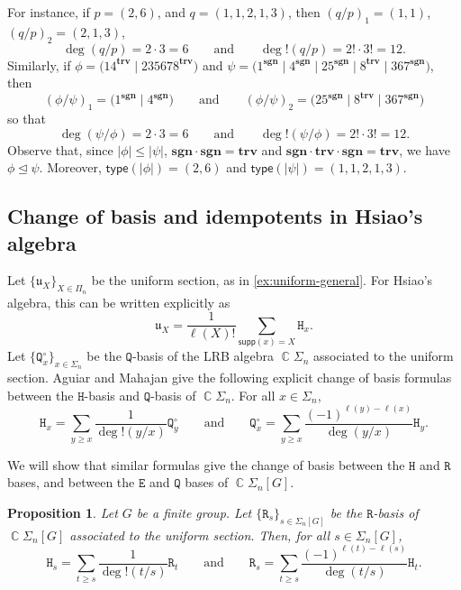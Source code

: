 \documentclass[11pt, oneside, reqno]{amsart}
\newtheorem{prop}[theorem]{Proposition}
\theoremstyle{definition}
\numberwithin{equation}{section}
\DeclareMathOperator{\C}{\mathbb{C}}
\def \kk{\C}
\def \uu{{\mathfrak{u}}}
\def \gsetcomposition{{\Sigma_n[G]}}
\def \hsiao {{\gsetcomposition}}
\DeclareMathOperator{\chleq}{\unlhd}
\def\qqand{\qquad\text{and}\qquad}
\def \supp{\mathsf{supp}}
\def \type{\mathsf{type}}
\def \sgn{\mathbf{sgn}}
\def \trv{\mathbf{trv}}
\newcommand{\B}[1]{\mathtt{#1}} 			%
\newcommand{\abs}[1]{|{#1}|} 				%
\begin{document}
For instance, if $p = (2,6)$, and $q = (1,1,2,1,3)$, then $(q/p)_1 = (1,1)$, $(q/p)_2 = (2,1,3)$,
\[
    \deg(q/p) = 2 \cdot 3 = 6
    \qqand
    \deg!(q/p) = 2! \cdot 3! = 12.
\]
Similarly, if $\phi = \big( 14^{\trv} \mid 235678^{\trv} \big)$ and
$\psi = \big( 1^{\sgn} \mid 4^{\sgn} \mid 25^{\sgn} \mid 8^{\trv} \mid 367^{\sgn} \big)$,
then
\begin{equation*}
    (\phi/\psi)_{1} = \big( 1^{\sgn} \mid 4^{\sgn} \big)
    \qqand
    (\phi/\psi)_{2} = \big( 25^{\sgn} \mid 8^{\trv} \mid 367^{\sgn} \big)
\end{equation*}
so that
\[
    \deg(\psi/\phi) = 2 \cdot 3 = 6
    \qqand
    \deg!(\psi/\phi) = 2! \cdot 3! = 12.
\]
Observe that,
since $\abs{\phi} \leq \abs{\psi}$, ${\sgn} \cdot {\sgn} = {\trv}$ and ${\sgn} \cdot {\trv} \cdot {\sgn} = {\trv}$,
we have $\phi \chleq \psi$. Moreover, $\type(\abs{\phi}) = (2,6)$ and $\type(\abs{\psi}) = (1,1,2,1,3)$.


\subsection{Change of basis and idempotents in Hsiao's algebra} \label{s:change-of-basis-hsiao}

Let $\{\uu_X\}_{X \in \Pi_n}$ be the uniform section, as in \cref{ex:uniform-general}.
For Hsiao's algebra, this can be written explicitly as 
\[
    \uu_X = \dfrac{1}{\ell(X)!} \sum_{\supp(x) = X} \B{H}_x.
\]
Let $\{\B{Q}^\circ_x\}_{x \in \Sigma_n}$ be the $\B{Q}$-basis of the LRB algebra $\kk \Sigma_n$ associated to the uniform section.
Aguiar and Mahajan \cite[Lemma 12.74]{am17} give the following explicit change of basis formulas between the $\B{H}$-basis and $\B{Q}$-basis of $\kk \Sigma_n$.
For all $x \in \Sigma_n$,
\begin{equation}\label{eq:Q0-basis}
    \B{H}_x = \sum_{y \geq x} \dfrac{1}{\deg!(y/x)} \B{Q}^\circ_y
    \qqand
    \B{Q}^\circ_x = \sum_{y \geq x} \dfrac{(-1)^{\ell(y) - \ell(x)}}{\deg(y/x)} \B{H}_y.
\end{equation}

We will show that similar formulas give the change of basis between the $\B{H}$ and $\B{R}$ bases, and between the $\B{E}$ and $\B{Q}$ bases of $\kk \hsiao$.

\begin{prop}
    Let $G$ be a finite group. Let $\{\B{R}_s\}_{s \in \hsiao}$ be the $\B{R}$-basis of $\kk \hsiao$ associated to the uniform section.
    Then, for all $s \in \hsiao$,
    \begin{equation}\label{eq:Hsiao-H-to-R}
        \B{H}_s =
            \sum_{t \geq s} \dfrac{1}{\deg!(t/s)} \B{R}_t
        \qqand
        \B{R}_s =
            \sum_{t \geq s} \dfrac{(-1)^{\ell(t) - \ell(s)}}{\deg(t/s)} \B{H}_t.
    \end{equation}
\end{prop}
\end{document}
